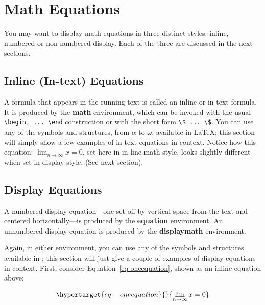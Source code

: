 \documentclass[manuscript,screen]{acmart}
\begin{document}
\hypertarget{math-equations}{%
\section{Math Equations}\label{math-equations}}

You may want to display math equations in three distinct styles: inline,
numbered or non-numbered display. Each of the three are discussed in the
next sections.

\hypertarget{inline-in-text-equations}{%
\subsection{Inline (In-text) Equations}\label{inline-in-text-equations}}

A formula that appears in the running text is called an inline or
in-text formula. It is produced by the \textbf{math} environment, which
can be invoked with the usual
\texttt{\textbackslash{}begin,\ ...\ \textbackslash{}end} construction
or with the short form
\texttt{\textbackslash{}\$\ ...\ \textbackslash{}\$}. You can use any of
the symbols and structures, from \(\alpha\) to \(\omega\), available in
\LaTeX\citep{Lamport:LaTeX}; this section will simply show a few
examples of in-text equations in context. Notice how this equation:
\(\lim_{n\rightarrow \infty}x=0\), set here in in-line math style, looks
slightly different when set in display style. (See next section).

\hypertarget{display-equations}{%
\subsection{Display Equations}\label{display-equations}}

A numbered display equation---one set off by vertical space from the
text and centered horizontally---is produced by the \textbf{equation}
environment. An unnumbered display equation is produced by the
\textbf{displaymath} environment.

Again, in either environment, you can use any of the symbols and
structures available in \LaTeX@; this section will just give a couple of
examples of display equations in context. First, consider
Equation~\ref{eq-oneequation}, shown as an inline equation above:

\begin{equation}\protect\hypertarget{eq-oneequation}{}{
\lim_{n\rightarrow \infty}x=0
}\label{eq-oneequation}\end{equation}
\end{document}

